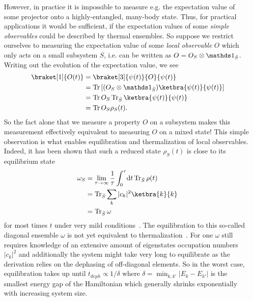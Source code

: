 However, in practice it is impossible to measure e.g. the expectation value of some projector onto a highly-entangled, many-body state. Thus, for practical applications it would be sufficient, if the expectation values of some \emph{simple observables} could be described by thermal ensembles. So suppose
we restrict ourselves to measuring the expectation value of some \emph{local observable} $O$ which only acts on a small subsystem $S$, i.e. can be written as $O=O_S\otimes \bbone_{\bar{S}}$. Writing out the evolution of the expectation value, we see
\begin{align}
	\braket[1]{O(t)} &= \braket[3]{\psi(t)}{O}{\psi(t)} \\
	& = \Tr \left[(O_S\otimes\bbone_{\bar{S}})\ketbra{\psi(t)}{\psi(t)}\right]\\
	& = \Tr O_S \Tr_{\bar S} \ketbra{\psi(t)}{\psi(t)}\\
	&= \Tr O_S \rho_S(t).
\end{align}
So the fact alone that we measure a property $O$ on a subsystem makes this measurement effectively equivalent to measuring $O$ on a mixed state! This simple observation is what enables equilibration and thermalization of local observables. Indeed, it has been shown that such a reduced state $\rho_S(t)$ is close to its equilibrium state
\begin{align}
	\omega_S &= \lim_{\tau\rightarrow\infty} \frac{1}{\tau} \int_{0}^{\tau}\!\mathrm{d}t \Tr_{\bar S}\rho(t)\\
	&= \Tr_{\bar S} \sum_k |c_k|^2 \ketbra{k}{k}\\
	&= \Tr_{\bar S} \omega
\end{align}\label{eq:diagonal-ensemble}
for most times $t$ under very mild conditions~\cite{reimannFoundationStatisticalMechanics2008,lindenQuantumMechanicalEvolution2009}. 
The equilibration to this so-called diagonal ensemble $\omega$ is not yet equivalent to thermalization~\cite{dziarmagaDynamicsQuantumPhase2010,polkovnikovColloquiumNonequilibriumDynamics2011}. For one $\omega$ still requires knowledge of an extensive amount of eigenstates occupation numbers  $|c_k|^2$ and additionally the system might take very long to equilibrate as the derivation relies on the dephasing of off-diagonal elements. So in the worst case, equilibration takes up until $t_{deph} \propto 1/\delta$ where $\delta=\min_{k,k'}|E_k-E_{k'}|$ is the smallest energy gap of the Hamiltonian which generally shrinks exponentially with increasing system size. 

